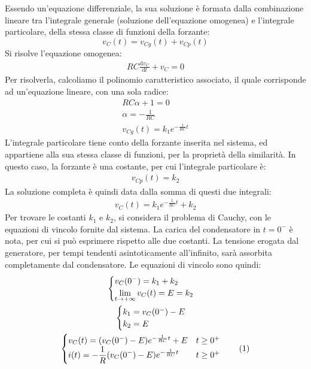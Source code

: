 \documentclass{article}
\newcommand{\df}{\mathrm{d}}
\newcommand{\tageq}{\tag{\stepcounter{equation}\theequation}}
\numberwithin{equation}{subsection}
\begin{document}
Essendo un'equazione differenziale, la sua soluzione è formata dalla combinazione lineare tra l'integrale generale (soluzione dell'equazione omogenea) e l'integrale particolare, della stessa classe di funzioni della forzante:
\begin{equation*}
    v_C(t)=v_{Cg}(t)+v_{Cp}(t)
\end{equation*}
Si risolve l'equazione omogenea:
\begin{gather*}
    RC\displaystyle\frac{\df v_C}{\df t}+v_C=0
\end{gather*}
Per risolverla, calcoliamo il polinomio caratteristico associato, il quale corrisponde ad un'equazione lineare, con una sola radice:
\begin{gather*}
    RC\alpha+1=0\\
    \alpha=\displaystyle-\frac{1}{RC}\\
    v_{Cg}(t)=k_1e^{-\frac{1}{RC}t}
\end{gather*}
L'integrale particolare tiene conto della forzante inserita nel sistema, ed appartiene alla sua stessa classe di funzioni, per la proprietà della similarità. In questo caso, 
la forzante è una costante, per cui l'integrale particolare è:
\begin{gather*}
    v_{Cp}(t)=k_2
\end{gather*}
La soluzione completa è quindi data dalla somma di questi due integrali:
\begin{gather*}
    v_C(t)=k_1e^{-\frac{1}{RC}t}+k_2
\end{gather*}
Per trovare le costanti $k_1$ e $k_2$, si considera il problema di Cauchy, con le equazioni di vincolo fornite dal sistema. La carica del condensatore in $t=0^-$ è nota, 
per cui si può esprimere rispetto alle due costanti. La tensione erogata dal generatore, per tempi tendenti asintoticamente all'infinito, sarà assorbita 
completamente dal condensatore. Le equazioni di vincolo sono quindi:
\begin{gather*}
    \begin{cases}
        v_C(0^-)=k_1+k_2\\
        \displaystyle\lim_{t\to+\infty}v_C(t)=E=k_2
    \end{cases}\\
    \begin{cases}
        k_1=v_C(0^-)-E\\
        k_2=E
    \end{cases}\\
    \begin{cases}
        v_C(t)=(v_C(0^-)-E)e^{-\frac{1}{RC}t}+E&t\geq0^+\\
        i(t)=-\displaystyle\frac{1}{R}(v_C(0^-)-E)e^{-\frac{1}{RC}t} &t\geq0^+
    \end{cases}\tageq
\end{gather*}
\end{document}
